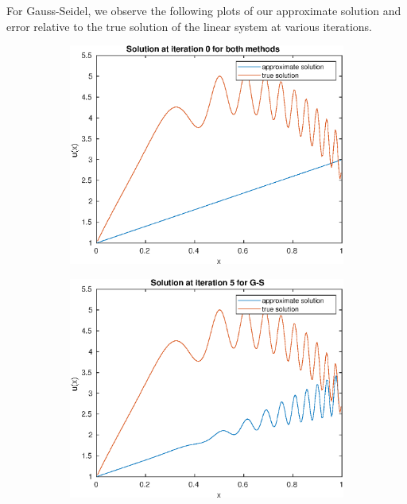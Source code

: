 \documentclass{article}
\begin{document}
For Gauss-Seidel, we observe the following plots of our approximate solution and error relative to the true solution of the linear system at various iterations.\\
\begin{figure}[H]
    \centering
    \begin{subfigure}{0.495\linewidth}
        \centering
        \includegraphics[width=\linewidth]{initial.eps}
    \end{subfigure}
    \begin{subfigure}{0.495\linewidth}
        \centering
        \includegraphics[width=\linewidth]{GS_i=5.eps}

\end{subfigure}
\end{figure}
\end{document}
